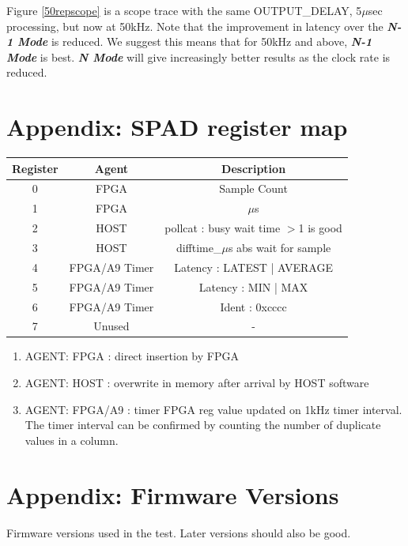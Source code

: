 \documentclass{article}
\begin{document}
Figure \ref{50repscope} is a scope trace with the same OUTPUT\_DELAY, 5$\mu$sec processing, but now at 50kHz.
Note that the improvement in latency over the \textit{\textbf{N-1 Mode}} is reduced.
We suggest this means that for 50kHz and above, \textit{\textbf{N-1 Mode}} is best.
\textit{\textbf{N Mode}} will give increasingly better results as the clock rate is reduced.

\section{Appendix: SPAD register map} \label{spadregmap}

\begin{center}
	\begin{tabular}{||c c c||} 
		\hline
		Register & Agent & Description \\ \hline\hline\hline
		0 & FPGA & Sample Count \\
		\hline
		1 & FPGA & $\mu$s \\
		\hline
		2 & HOST & pollcat : busy wait time $>$1 is good \\
		\hline
		3 & HOST & difftime\_$\mu$s abs wait for sample \\ [1ex] 
		\hline
		4 & FPGA/A9 Timer & Latency : LATEST | AVERAGE \\
		\hline
		5 & FPGA/A9 Timer & Latency : MIN | MAX \\
		\hline
		6 & FPGA/A9 Timer & Ident : 0xcccc \\
		\hline
		7 & Unused & - \\
		\hline
	\end{tabular}
\end{center}

\begin{enumerate}
	\item AGENT: FPGA    : direct insertion by FPGA
	\item AGENT: HOST    : overwrite in memory after arrival by HOST software
	\item AGENT: FPGA/A9 : timer FPGA reg value updated on 1kHz timer interval. The timer interval can be confirmed by counting the number of duplicate values in a column.
\end{enumerate}

\section{Appendix: Firmware Versions} \label{firmware}

Firmware versions used in the test. Later versions should also be good.
\end{document}
